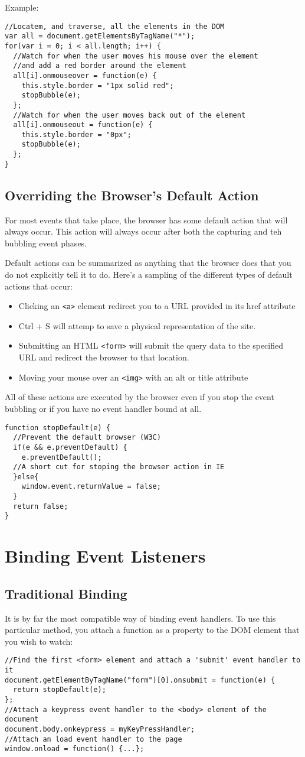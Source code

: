 \documentclass[a4paper,11pt]{book}
\begin{document}
Example:
\begin{verbatim}
//Locatem, and traverse, all the elements in the DOM
var all = document.getElementsByTagName("*");
for(var i = 0; i < all.length; i++) {
  //Watch for when the user moves his mouse over the element
  //and add a red border around the element
  all[i].onmouseover = function(e) {
    this.style.border = "1px solid red";
    stopBubble(e);
  };
  //Watch for when the user moves back out of the element
  all[i].onmouseout = function(e) {
    this.style.border = "0px";
    stopBubble(e);
  };
}
\end{verbatim}
\subsection{Overriding the Browser's Default Action}
For most events that take place, the browser has some default action that will
always occur. This action will always occur after both the capturing and teh
bubbling event phases.

Default actions can be summarized as anything that the browser does that you do
not explicitly tell it to do. Here's a sampling of the different types of
default actions that occur:
\begin{itemize}
\item Clicking an \verb|<a>| element redirect you to a URL provided in its href
attribute
\item Ctrl + S will attemp to save a physical representation of the site.
\item Submitting an HTML \verb|<form>| will submit the query data to the
specified URL and redirect the browser to that location.
\item Moving your mouse over an \verb|<img>| with an alt or title attribute 
\end{itemize}
All of these actions are executed by the browser even if you stop the event
bubbling or if you have no event handler bound at all.
\begin{verbatim}
function stopDefault(e) {
  //Prevent the default browser (W3C)
  if(e && e.preventDefault) {
    e.preventDefault();
  //A short cut for stoping the browser action in IE
  }else{
    window.event.returnValue = false;
  }
  return false;
}
\end{verbatim}
\section{Binding Event Listeners}
\subsection{Traditional Binding}
It is by far the most compatible way of binding event handlers. To use this
particular method, you attach a function as a property to the DOM element that
you wish to watch:
\begin{verbatim}
//Find the first <form> element and attach a 'submit' event handler to it
document.getElementByTagName("form")[0].onsubmit = function(e) {
  return stopDefault(e);
};
//Attach a keypress event handler to the <body> element of the document
document.body.onkeypress = myKeyPressHandler;
//Attach an load event handler to the page
window.onload = function() {...};
\end{verbatim}
\end{document}
